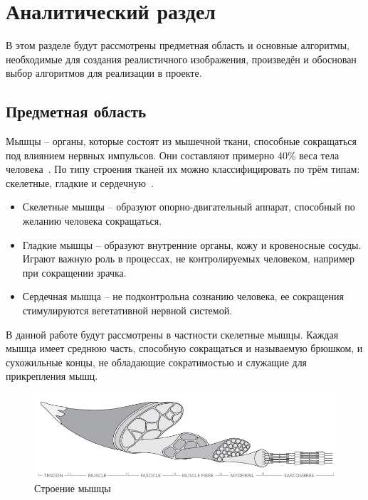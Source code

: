\chapter{Аналитический раздел}
\label{cha:analysis}
 В этом разделе будут рассмотрены предметная область и основные алгоритмы, необходимые для создания реалистичного изображения, произведён и обоснован выбор алгоритмов для реализации в проекте.
\section{Предметная область}
\label{sec:item_ran}
Мышцы -- органы, которые состоят из мышечной ткани, способные сокращаться под влиянием нервных импульсов. Они составляют примерно 40\% веса тела человека~\cite{muscle_01}. По типу строения тканей их можно классифицировать по трём типам: скелетные, гладкие и сердечную~\cite{muscle_02}.
\begin{itemize}
	\item Скелетные мышцы -- образуют опорно-двигательный аппарат, способный по желанию человека сокращаться.
	\item Гладкие мышцы -- образуют внутренние органы, кожу и кровеносные сосуды. Играют важную роль в процессах, не контролируемых человеком, например при сокращении зрачка.
	\item Сердечная мышца -- не подконтрольна сознанию человека, ее сокращения стимулируются вегетативной нервной системой.
\end{itemize}
В данной работе будут рассмотрены в частности скелетные мышцы. Каждая мышца имеет среднюю часть, способную сокращаться и называемую брюшком, и сухожильные концы, не обладающие сократимостью и служащие для прикрепления мышц.
\begin{figure}
	\centering
	\includegraphics[width=0.7\linewidth]{images/muscle_struct}
	\caption[Строение мышцы]{Строение мышцы}
	\label{fig:musclestruct}
\end{figure}

